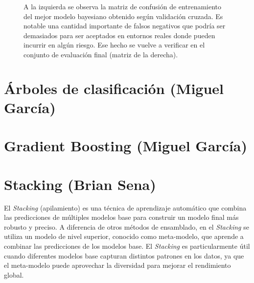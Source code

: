 \documentclass[12pt,letterpaper]{article}
\begin{document}
\begin{figure}[!ht]
\centering
{}
\caption{A la izquierda se observa la matriz de confusión de entrenamiento del mejor modelo bayesiano obtenido según validación cruzada. Es notable una cantidad importante de falsos negativos que podría ser demasiados para ser aceptados en entornos reales donde pueden incurrir en algún riesgo.
Ese hecho se vuelve a verificar en el conjunto de evaluación final (matriz de la derecha). }
\label{fig:BayesMatrix}
\end{figure}


\section{Árboles de clasificación (Miguel García)}
\section{Gradient Boosting (Miguel García)}
\section{Stacking (Brian Sena)}
El \textit{Stacking} (apilamiento) es una técnica de aprendizaje automático que combina las predicciones de múltiples modelos base para construir un modelo final más robusto y preciso. 
A diferencia de otros métodos de ensamblado, en el \textit{Stacking} se utiliza un modelo de nivel superior, conocido como meta-modelo, que aprende a combinar las predicciones de los modelos base.
El \textit{Stacking} es particularmente útil cuando diferentes modelos base capturan distintos patrones en los datos, ya que el meta-modelo puede aprovechar la diversidad para mejorar el rendimiento global. 
\end{document}
